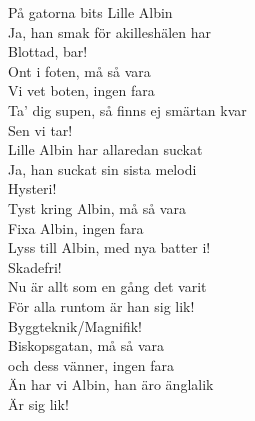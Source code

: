 \documentclass[11pt]{book}
\begin{document}
\begin{minipage}{0.45\textwidth}
	
	\noindent
	På gatorna bits Lille Albin\\
	Ja, han smak för akilleshälen har\\
	Blottad, bar!\\

	\noindent
	Ont i foten, må så vara\\
	Vi vet boten, ingen fara\\
	Ta' dig supen, så finns ej smärtan kvar\\
	Sen vi tar!\\

	\noindent
	Lille Albin har allaredan suckat\\
	Ja, han suckat sin sista melodi\\
	Hysteri!\\

	\noindent
	Tyst kring Albin, må så vara\\
	Fixa Albin, ingen fara\\
	Lyss till Albin, med nya batter i!\\
	Skadefri!\\

	\noindent
	Nu är allt som en gång det varit\\
	För alla runtom är han sig lik!\\
	Byggteknik/Magnifik!\\

	\noindent
	Biskopsgatan, må så vara\\
	och dess vänner, ingen fara\\
	Än har vi Albin, han äro änglalik\\
	Är sig lik!\\

	
\end{minipage}
\end{document}
